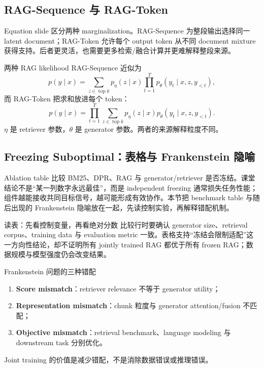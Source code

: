 \subsection{RAG-Sequence 与 RAG-Token}

Equation slide 区分两种 marginalization。RAG-Sequence 为整段输出选择同一 latent document；RAG-Token 允许每个 output token 从不同 document mixture 获得支持。后者更灵活，也需要更多检索/融合计算并更难解释整段来源。


\begin{importantbox}{两种 RAG likelihood}
RAG-Sequence 近似为
\[
p(y\mid x)=\sum_{z\in\operatorname{top}k}p_\eta(z\mid x)
\prod_{t=1}^{T}p_\theta(y_t\mid x,z,y_{<t}),
\]
而 RAG-Token 把求和放进每个 token：
\[
p(y\mid x)=\prod_{t=1}^{T}\sum_{z\in\operatorname{top}k}
p_\eta(z\mid x)p_\theta(y_t\mid x,z,y_{<t}).
\]
$\eta$ 是 retriever 参数，$\theta$ 是 generator 参数。两者的来源解释粒度不同。
\end{importantbox}

\subsection{Freezing Suboptimal：表格与 Frankenstein 隐喻}

Ablation table 比较 BM25、DPR、RAG 与 generator/retriever 是否冻结。课堂结论不是“某一列数字永远最佳”，而是 independent freezing 通常损失任务性能；组件越能接收共同目标信号，越可能形成有效协作。本节把 benchmark table 与随后出现的 Frankenstein 隐喻放在一起，先读控制实验，再解释错配机制。


\begin{knowledgebox}{读表：先看控制变量，再看绝对分数}
比较行时要确认 generator size、retrieval corpus、training data 与 evaluation metric 一致。表格支持“冻结会限制适配”这一方向性结论，却不证明所有 jointly trained RAG 都优于所有 frozen RAG；数据规模与模型强度仍会改变结果。
\end{knowledgebox}


\begin{warningbox}{Frankenstein 问题的三种错配}
\begin{enumerate}
  \item \textbf{Score mismatch}：retriever relevance 不等于 generator utility；
  \item \textbf{Representation mismatch}：chunk 粒度与 generator attention/fusion 不匹配；
  \item \textbf{Objective mismatch}：retrieval benchmark、language modeling 与 downstream task 分别优化。
\end{enumerate}
Joint training 的价值是减少错配，不是消除数据错误或推理错误。
\end{warningbox}

